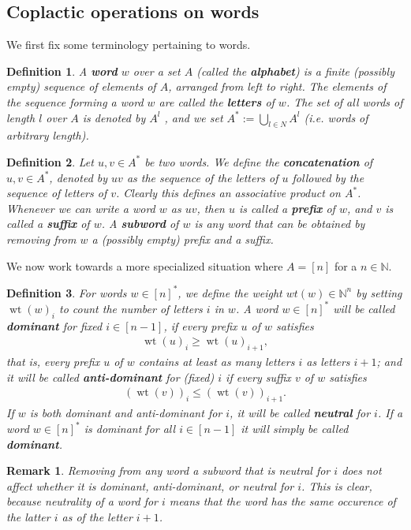 \documentclass{article}
\newtheorem{defn}{Definition}
\newtheorem{rem}{Remark}
\DeclareMathOperator{\wt}{wt}
\begin{document}
\subsection{Coplactic operations on words}
We first fix some terminology pertaining to words.
\begin{defn} A \textbf{word} $w$ over a set $A$ (called the \textbf{alphabet}) is a finite \textit{(possibly empty)} sequence of elements of $A$, arranged from left to right. The elements of the sequence forming a word $w$ are called the \textbf{letters} of $w$. The set of all words of length $l$ over $A$ is denoted by $A^{l}$ , and we set $A^{*}:=\bigcup_{l\in N}A^{l}$ (i.e. words of arbitrary length).
\end{defn}
\begin{defn}
Let $u,v \in A^*$ be two words. We define the \textbf{concatenation} of $u,v \in A^*$, denoted by $uv$ as the sequence of the letters of $u$ followed by the sequence of letters of $v$.  Clearly this defines an associative product on $A^*$. Whenever we can write a word $w$ as $uv$, then $u$ is called a \textbf{prefix} of $w$, and $v$ is called a \textbf{suffix} of $w$. A \textbf{subword} of $w$ is any word that can be obtained by removing from $w$ a (possibly empty) prefix and a suffix. 
\end{defn}
We now work towards a more specialized situation where $A=[n]$ for a $n \in \mathbb{N}$.
\begin{defn}
For words $w \in [n]^*$, we define the weight $wt(w) \in \mathbb{N}^n$ by setting $\wt(w)_i$ to count the number of letters $i$ in $w$. A word $w \in [n]^*$ will be called \textbf{dominant} for fixed $i \in [n-1]$, if every prefix $u$ of $w$ satisfies 
\begin{align}
    \wt(u)_i \geq \wt(u)_{i+1},
\end{align}
that is, every prefix $u$ of $w$ contains at least as many letters $i$ as letters $i+ 1$;
and it will be called \textbf{anti-dominant} for (fixed) $i$ if every suffix $v$ of $w$ satisfies \begin{align}
    ( \wt(v))_i \leq (\wt(v))_{i+1}. 
\end{align}
If $w$ is both dominant and anti-dominant for $i$, it will be called \textbf{neutral} for $i$. If a word $w \in [n]^*$ is  dominant for all $i \in [n-1]$ it will simply be called \textbf{dominant}.
\end{defn}
\begin{rem}
Removing from any word a subword that is neutral for $i$ does not affect whether it is dominant, anti-dominant,  or neutral for $i$. This is clear, because neutrality of a word for $i$ means that the word has the same occurence of the latter $i$ as of the letter $i+1$. 
\end{rem}
\end{document}
